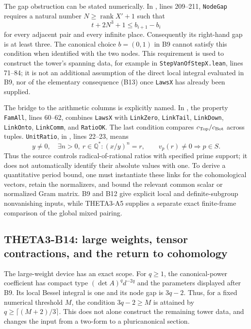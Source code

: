 \documentclass[11pt]{article}
\newcommand{\Q}{\mathbb Q}\newcommand{\C}{\mathbb C}\newcommand{\Z}{\mathbb Z}\newcommand{\R}{\mathbb R}\newcommand{\A}{\mathbb A}\newcommand{\OO}{\mathcal O}
\theoremstyle{definition}\newtheorem{definition}[theorem]{Definition}\newtheorem{remark}[theorem]{Remark}
\begin{document}
The gap obstruction can be stated numerically. In , lines 209--211, \texttt{NodeGap} requires a natural number $N\geq\operatorname{rank}X'+1$ such that
\[
 t+2N^3+1\leq b_{i+1}-b_i
\]
for every adjacent pair and every infinite place. Consequently its right-hand gap is at least three. The canonical choice $b=(0,1)$ in B9 cannot satisfy this condition when identified with the two nodes. This requirement is used to construct the tower's spanning data, for example in \texttt{StepVanOfStepX.lean}, lines 71--84; it is not an additional assumption of the direct local integral evaluated in B9, nor of the elementary consequence (B13) once \texttt{LawsX} has already been supplied.

The bridge to the arithmetic columns is explicitly named. In
, the property
\texttt{FamAll}, lines 60--62, combines \texttt{LawsX} with
\texttt{LinkZero}, \texttt{LinkTail}, \texttt{LinkDown},
\texttt{LinkOnto}, \texttt{LinkComm}, and \texttt{RatioOK}.
The last condition compares $c_{\rm Top}/c_{\rm Bot}$ across tuples.
\texttt{UnitRatio}, in , lines 22--23, means
\[
 y\ne0,\quad \exists n>0,\ r\in\Q^*:
 (x/y)^n=r,
 \qquad v_p(r)\ne0\Longrightarrow p\in S.
\]
Thus the source controls radical-of-rational ratios with specified prime support; it does not automatically identify their absolute values with one. To derive a quantitative period bound, one must instantiate these links for the cohomological vectors, retain the normalizers, and bound the relevant common scalar or normalized Gram matrix. B9 and B12 give explicit local and definite-subgroup nonvanishing inputs, while THETA3-A5 supplies a separate exact finite-frame comparison of the global mixed pairing.

\subsection{THETA3-B14: large weights, tensor contractions, and the return to cohomology}\label{B14}

The large-weight device has an exact scope. For $q\geq1$, the canonical-power coefficient has compact type $(\det A)^qd^{-2q}$ and the parameters displayed after B9. Its local Bessel integral is one and its node gap is $3q-2$. Thus, for a fixed numerical threshold $M$, the condition $3q-2\geq M$ is attained by $q\geq\lceil(M+2)/3\rceil$. This does not alone construct the remaining tower data, and changes the input from a two-form to a pluricanonical section.
\end{document}
